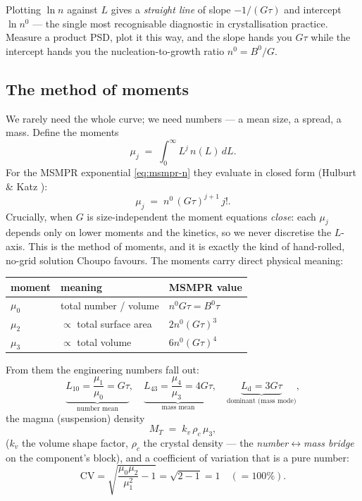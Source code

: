 \documentclass[11pt,a4paper]{article}
\begin{document}
Plotting $\ln n$ against $L$ gives a \emph{straight line} of slope
$-1/(G\tau)$ and intercept $\ln n^0$ --- the single most recognisable
diagnostic in crystallisation practice.  Measure a product PSD, plot it
this way, and the slope hands you $G\tau$ while the intercept hands you
the nucleation-to-growth ratio $n^0=B^0/G$.

\subsection{The method of moments}

We rarely need the whole curve; we need numbers --- a mean size, a
spread, a mass.  Define the moments
\begin{equation}
   \mu_j \;=\; \int_0^\infty L^j\,n(L)\,dL.
\end{equation}
For the MSMPR exponential \eqref{eq:msmpr-n} they evaluate in closed
form (Hulburt \& Katz \cite{HulburtKatz}):
\begin{equation}
   \mu_j \;=\; n^0\,(G\tau)^{j+1}\,j!.
   \label{eq:moments}
\end{equation}
Crucially, when $G$ is size-independent the moment equations
\emph{close}: each $\mu_j$ depends only on lower moments and the
kinetics, so we never discretise the $L$-axis.  This is the method of
moments, and it is exactly the kind of hand-rolled, no-grid solution
Choupo favours.  The moments carry direct physical meaning:
\begin{center}\small
\begin{tabular}{@{}lll@{}}
\toprule
moment & meaning & MSMPR value \\
\midrule
$\mu_0$ & total number / volume        & $n^0 G\tau = B^0\tau$ \\
$\mu_2$ & $\propto$ total surface area & $2 n^0 (G\tau)^3$ \\
$\mu_3$ & $\propto$ total volume       & $6 n^0 (G\tau)^4$ \\
\bottomrule
\end{tabular}
\end{center}
From them the engineering numbers fall out:
\begin{equation}
   \underbrace{L_{10}=\frac{\mu_1}{\mu_0}=G\tau}_{\text{number mean}},
   \quad
   \underbrace{L_{43}=\frac{\mu_4}{\mu_3}=4G\tau}_{\text{mass mean}},
   \quad
   \underbrace{L_{\text{d}}=3G\tau}_{\text{dominant (mass mode)}},
\end{equation}
the magma (suspension) density
\begin{equation}
   M_T \;=\; k_v\,\rho_c\,\mu_3,
   \label{eq:magma}
\end{equation}
($k_v$ the volume shape factor, $\rho_c$ the crystal density --- the
\emph{number$\leftrightarrow$mass bridge} on the component's
 block), and a coefficient of variation
that is a pure number:
\begin{equation}
   \mathrm{CV} = \sqrt{\frac{\mu_0\mu_2}{\mu_1^2}-1}
               = \sqrt{2-1} = 1 \quad (=100\%).
   \label{eq:cv}
\end{equation}
\end{document}
